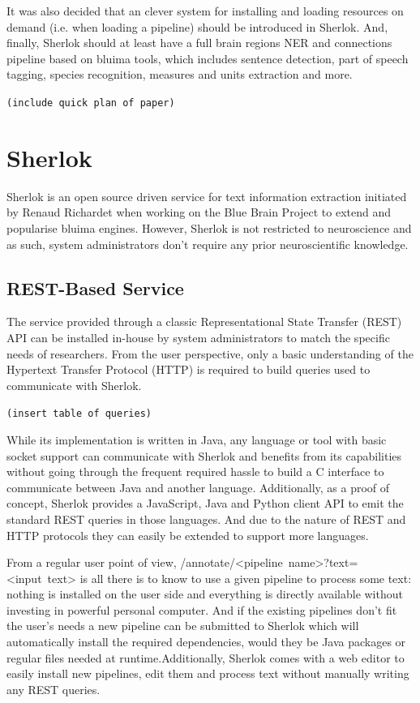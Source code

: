 \documentclass{article}
\newcommand{\TODO}[1]{\texttt{\textcolor{YellowOrange}{(#1)}}} %
\newcommand{\REST}[1]{\textsf{#1}}
\begin{document}
It was also decided that an clever system for installing and loading resources on demand (i.e.
when loading a pipeline) should be introduced in Sherlok. And, finally, Sherlok should at least have
a full brain regions NER and connections pipeline based on bluima tools, which includes sentence
detection, part of speech tagging, species recognition, measures and units extraction and more.

\TODO{include quick plan of paper}

\section{Sherlok}

Sherlok is an open source driven service for text information extraction initiated by Renaud
Richardet when working on the Blue Brain Project to extend and popularise bluima engines. However,
Sherlok is not restricted to neuroscience and as such, system administrators don't require any prior
neuroscientific knowledge.

\subsection{REST-Based Service}

The service provided through a classic Representational State Transfer (REST) API can be installed
in-house by system administrators to match the specific needs of researchers. From the user
perspective, only a basic understanding of the Hypertext Transfer Protocol (HTTP) is required to
build queries used to communicate with Sherlok.

\TODO{insert table of queries}

While its implementation is written in Java, any language or tool with basic socket support can
communicate with Sherlok and benefits from its capabilities without going through the frequent
required hassle to build a C interface to communicate between Java and another language.
Additionally, as a proof of concept, Sherlok provides a JavaScript, Java and Python client API to
emit the standard REST queries in those languages. And due to the nature of REST and HTTP protocols
they can easily be extended to support more languages.

From a regular user point of view, \REST{/annotate/<pipeline~name>?text=<input~text>} is all there is to
know to use a given pipeline to process some text: nothing is installed on the user side and
everything is directly available without investing in powerful personal computer. And if the
existing pipelines don't fit the user's needs a new pipeline can be submitted to Sherlok which will
automatically install the required dependencies, would they be Java packages or regular files needed
at runtime.Additionally, Sherlok comes with a web editor to easily install new pipelines, edit them
and process text without manually writing any REST queries.
\end{document}
